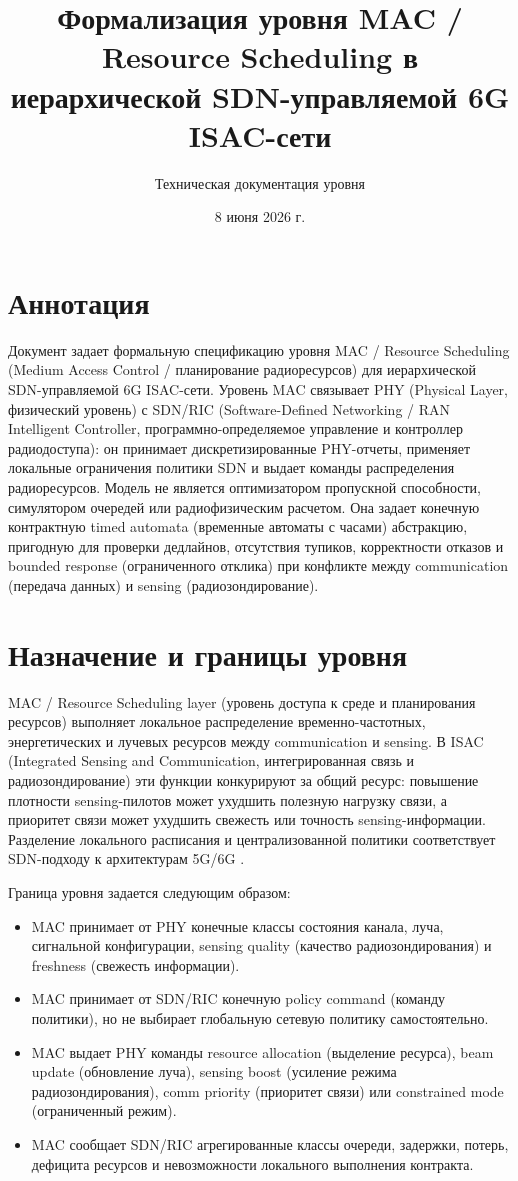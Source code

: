 \documentclass[10pt,a4paper]{article}
\title{Формализация уровня MAC / Resource Scheduling в иерархической SDN-управляемой 6G ISAC-сети}
\author{Техническая документация уровня}
\date{8 июня 2026 г.}
\begin{document}
\maketitle

\section*{Аннотация}

Документ задает формальную спецификацию уровня MAC / Resource Scheduling (Medium Access Control / планирование радиоресурсов) для иерархической SDN-управляемой 6G ISAC-сети. Уровень MAC связывает PHY (Physical Layer, физический уровень) с SDN/RIC (Software-Defined Networking / RAN Intelligent Controller, программно-определяемое управление и контроллер радиодоступа): он принимает дискретизированные PHY-отчеты, применяет локальные ограничения политики SDN и выдает команды распределения радиоресурсов. Модель не является оптимизатором пропускной способности, симулятором очередей или радиофизическим расчетом. Она задает конечную контрактную timed automata (временные автоматы с часами) абстракцию, пригодную для проверки дедлайнов, отсутствия тупиков, корректности отказов и bounded response (ограниченного отклика) при конфликте между communication (передача данных) и sensing (радиозондирование).

\section{Назначение и границы уровня}

MAC / Resource Scheduling layer (уровень доступа к среде и планирования ресурсов) выполняет локальное распределение временно-частотных, энергетических и лучевых ресурсов между communication и sensing. В ISAC (Integrated Sensing and Communication, интегрированная связь и радиозондирование) эти функции конкурируют за общий ресурс: повышение плотности sensing-пилотов может ухудшить полезную нагрузку связи, а приоритет связи может ухудшить свежесть или точность sensing-информации. Разделение локального расписания и централизованной политики соответствует SDN-подходу к архитектурам 5G/6G \cite{mosudi_sdn,zolanvari_sdn}.

Граница уровня задается следующим образом:
\begin{itemize}
  \item MAC принимает от PHY конечные классы состояния канала, луча, сигнальной конфигурации, sensing quality (качество радиозондирования) и freshness (свежесть информации).
  \item MAC принимает от SDN/RIC конечную policy command (команду политики), но не выбирает глобальную сетевую политику самостоятельно.
  \item MAC выдает PHY команды resource allocation (выделение ресурса), beam update (обновление луча), sensing boost (усиление режима радиозондирования), comm priority (приоритет связи) или constrained mode (ограниченный режим).
  \item MAC сообщает SDN/RIC агрегированные классы очереди, задержки, потерь, дефицита ресурсов и невозможности локального выполнения контракта.
\end{itemize}
\end{document}
